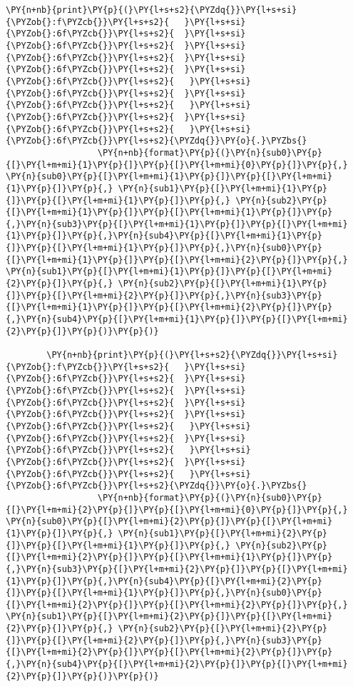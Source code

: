 {\begin{enumerate}
\begin{Verbatim}[commandchars=\\\{\}]
        \PY{n+nb}{print}\PY{p}{(}\PY{l+s+s2}{\PYZdq{}}\PY{l+s+si}{\PYZob{}:f\PYZcb{}}\PY{l+s+s2}{   }\PY{l+s+si}{\PYZob{}:6f\PYZcb{}}\PY{l+s+s2}{  }\PY{l+s+si}{\PYZob{}:6f\PYZcb{}}\PY{l+s+s2}{  }\PY{l+s+si}{\PYZob{}:6f\PYZcb{}}\PY{l+s+s2}{  }\PY{l+s+si}{\PYZob{}:6f\PYZcb{}}\PY{l+s+s2}{  }\PY{l+s+si}{\PYZob{}:6f\PYZcb{}}\PY{l+s+s2}{   }\PY{l+s+si}{\PYZob{}:6f\PYZcb{}}\PY{l+s+s2}{  }\PY{l+s+si}{\PYZob{}:6f\PYZcb{}}\PY{l+s+s2}{   }\PY{l+s+si}{\PYZob{}:6f\PYZcb{}}\PY{l+s+s2}{  }\PY{l+s+si}{\PYZob{}:6f\PYZcb{}}\PY{l+s+s2}{   }\PY{l+s+si}{\PYZob{}:6f\PYZcb{}}\PY{l+s+s2}{\PYZdq{}}\PY{o}{.}\PYZbs{}
                  \PY{n+nb}{format}\PY{p}{(}\PY{n}{sub0}\PY{p}{[}\PY{l+m+mi}{1}\PY{p}{]}\PY{p}{[}\PY{l+m+mi}{0}\PY{p}{]}\PY{p}{,} \PY{n}{sub0}\PY{p}{[}\PY{l+m+mi}{1}\PY{p}{]}\PY{p}{[}\PY{l+m+mi}{1}\PY{p}{]}\PY{p}{,} \PY{n}{sub1}\PY{p}{[}\PY{l+m+mi}{1}\PY{p}{]}\PY{p}{[}\PY{l+m+mi}{1}\PY{p}{]}\PY{p}{,} \PY{n}{sub2}\PY{p}{[}\PY{l+m+mi}{1}\PY{p}{]}\PY{p}{[}\PY{l+m+mi}{1}\PY{p}{]}\PY{p}{,}\PY{n}{sub3}\PY{p}{[}\PY{l+m+mi}{1}\PY{p}{]}\PY{p}{[}\PY{l+m+mi}{1}\PY{p}{]}\PY{p}{,}\PY{n}{sub4}\PY{p}{[}\PY{l+m+mi}{1}\PY{p}{]}\PY{p}{[}\PY{l+m+mi}{1}\PY{p}{]}\PY{p}{,}\PY{n}{sub0}\PY{p}{[}\PY{l+m+mi}{1}\PY{p}{]}\PY{p}{[}\PY{l+m+mi}{2}\PY{p}{]}\PY{p}{,} \PY{n}{sub1}\PY{p}{[}\PY{l+m+mi}{1}\PY{p}{]}\PY{p}{[}\PY{l+m+mi}{2}\PY{p}{]}\PY{p}{,} \PY{n}{sub2}\PY{p}{[}\PY{l+m+mi}{1}\PY{p}{]}\PY{p}{[}\PY{l+m+mi}{2}\PY{p}{]}\PY{p}{,}\PY{n}{sub3}\PY{p}{[}\PY{l+m+mi}{1}\PY{p}{]}\PY{p}{[}\PY{l+m+mi}{2}\PY{p}{]}\PY{p}{,}\PY{n}{sub4}\PY{p}{[}\PY{l+m+mi}{1}\PY{p}{]}\PY{p}{[}\PY{l+m+mi}{2}\PY{p}{]}\PY{p}{)}\PY{p}{)}
        
        \PY{n+nb}{print}\PY{p}{(}\PY{l+s+s2}{\PYZdq{}}\PY{l+s+si}{\PYZob{}:f\PYZcb{}}\PY{l+s+s2}{   }\PY{l+s+si}{\PYZob{}:6f\PYZcb{}}\PY{l+s+s2}{  }\PY{l+s+si}{\PYZob{}:6f\PYZcb{}}\PY{l+s+s2}{  }\PY{l+s+si}{\PYZob{}:6f\PYZcb{}}\PY{l+s+s2}{  }\PY{l+s+si}{\PYZob{}:6f\PYZcb{}}\PY{l+s+s2}{  }\PY{l+s+si}{\PYZob{}:6f\PYZcb{}}\PY{l+s+s2}{   }\PY{l+s+si}{\PYZob{}:6f\PYZcb{}}\PY{l+s+s2}{  }\PY{l+s+si}{\PYZob{}:6f\PYZcb{}}\PY{l+s+s2}{   }\PY{l+s+si}{\PYZob{}:6f\PYZcb{}}\PY{l+s+s2}{  }\PY{l+s+si}{\PYZob{}:6f\PYZcb{}}\PY{l+s+s2}{   }\PY{l+s+si}{\PYZob{}:6f\PYZcb{}}\PY{l+s+s2}{\PYZdq{}}\PY{o}{.}\PYZbs{}
                  \PY{n+nb}{format}\PY{p}{(}\PY{n}{sub0}\PY{p}{[}\PY{l+m+mi}{2}\PY{p}{]}\PY{p}{[}\PY{l+m+mi}{0}\PY{p}{]}\PY{p}{,} \PY{n}{sub0}\PY{p}{[}\PY{l+m+mi}{2}\PY{p}{]}\PY{p}{[}\PY{l+m+mi}{1}\PY{p}{]}\PY{p}{,} \PY{n}{sub1}\PY{p}{[}\PY{l+m+mi}{2}\PY{p}{]}\PY{p}{[}\PY{l+m+mi}{1}\PY{p}{]}\PY{p}{,} \PY{n}{sub2}\PY{p}{[}\PY{l+m+mi}{2}\PY{p}{]}\PY{p}{[}\PY{l+m+mi}{1}\PY{p}{]}\PY{p}{,}\PY{n}{sub3}\PY{p}{[}\PY{l+m+mi}{2}\PY{p}{]}\PY{p}{[}\PY{l+m+mi}{1}\PY{p}{]}\PY{p}{,}\PY{n}{sub4}\PY{p}{[}\PY{l+m+mi}{2}\PY{p}{]}\PY{p}{[}\PY{l+m+mi}{1}\PY{p}{]}\PY{p}{,}\PY{n}{sub0}\PY{p}{[}\PY{l+m+mi}{2}\PY{p}{]}\PY{p}{[}\PY{l+m+mi}{2}\PY{p}{]}\PY{p}{,} \PY{n}{sub1}\PY{p}{[}\PY{l+m+mi}{2}\PY{p}{]}\PY{p}{[}\PY{l+m+mi}{2}\PY{p}{]}\PY{p}{,} \PY{n}{sub2}\PY{p}{[}\PY{l+m+mi}{2}\PY{p}{]}\PY{p}{[}\PY{l+m+mi}{2}\PY{p}{]}\PY{p}{,}\PY{n}{sub3}\PY{p}{[}\PY{l+m+mi}{2}\PY{p}{]}\PY{p}{[}\PY{l+m+mi}{2}\PY{p}{]}\PY{p}{,}\PY{n}{sub4}\PY{p}{[}\PY{l+m+mi}{2}\PY{p}{]}\PY{p}{[}\PY{l+m+mi}{2}\PY{p}{]}\PY{p}{)}\PY{p}{)}
        

\end{Verbatim}
\end{enumerate}}
